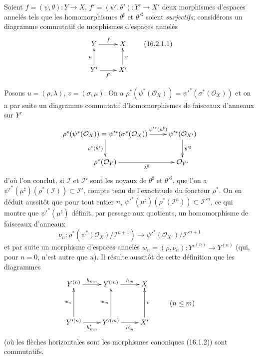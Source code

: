 \begin{env}[16.2.1]
\label{IV.16.2.1}
Soient $f=(\psi,\theta):Y\to X$,
$f'=(\psi',\theta'):Y'\to X'$ deux morphismes d'espaces annelés tels que les
homomorphismes $\theta^\sharp$ et $\theta'^\sharp$ soient \emph{surjectifs}; considérons un
diagramme commutatif de morphismes d'espaces annelés
\[
  \xymatrix{
    Y \ar[r]^f & X \\
    Y' \ar[r]_{f'} \ar[u]^u & X' \ar[u]_v
  }
  \tag{16.2.1.1}
  \label{IV.16.2.1.1}
\]

Posons $u=(\rho,\lambda)$, $v=(\sigma,\mu)$. On a
$\rho^*(\psi^*(\mathcal{O}_X))=
\psi'^*(\sigma^*(\mathcal{O}_X))$ et on a par suite un diagramme commutatif
d'homomorphismes de faisceaux d'anneaux sur $Y'$
\[
  \xymatrix{
    \rho^*(\psi^*(\mathcal{O}_X))
      =\psi'^*(\sigma^*(\mathcal{O}_X))
      \ar[r]^-{\psi'^*(\mu^\sharp)}
      \ar[d]_{\rho^*(\theta^\sharp)}
      & \psi'^*(\mathcal{O}_{X'}) \ar[d]^{\theta'^\sharp} \\
    \rho^*(\mathcal{O}_Y) \ar[r]_-{\lambda^\sharp}
      & \mathcal{O}_{Y'}
  }
\]
d'où l'on conclut, si $\mathscr{I}$ et $\mathscr{I}'$ sont les noyaux de
$\theta^\sharp$ et $\theta'^\sharp$, que l'on a
$\psi'^*(\mu^\sharp)(\rho^*(\mathscr{I}))\subset\mathscr{I}'$, compte tenu de
l'exactitude du foncteur $\rho^*$. On en déduit aussitôt que pour tout entier
$n$,
$\psi'^*(\mu^\sharp)(\rho^*(\mathscr{I}^n))\subset\mathscr{I}'^n$, ce qui montre
que $\psi'^*(\mu^\sharp)$ définit, par passage aux quotients, un homomorphisme de
faisceaux d'anneaux
\[
  \nu_n:
  \rho^*(\psi^*(\mathcal{O}_X)/\mathscr{I}^{n+1})
  \longrightarrow
  \psi'^*(\mathcal{O}_{X'})/\mathscr{I}'^{n+1}
  \tag{16.2.1.2}
  \label{IV.16.2.1.2}
\]
et par suite un morphisme d'espaces annelés
$w_n=(\rho,\nu_n):Y'^{(n)}\to Y^{(n)}$ (qui, pour $n=0$, n'est autre que
$u$). Il résulte aussitôt de cette définition que les diagrammes
\[
  \xymatrix@R=1pc{
    Y^{(n)} \ar[r]^-{h_{mn}} & Y^{(m)} \ar[r]^-{h_m} & X \\
    & & & (n\leq m) \\
    Y'^{(n)} \ar[r]_-{h'_{mn}} \ar[uu]^-{w_n}
      & Y'^{(m)} \ar[r]_-{h'_m} \ar[uu]^-{w_m}
      & X' \ar[uu]_-v
  }
\]
(où les flèches horizontales sont les morphismes canoniques (16.1.2)) sont
commutatifs.


\end{env}
